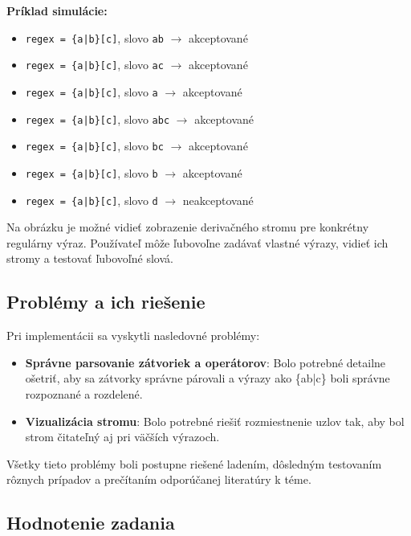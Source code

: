 \documentclass[a4paper,12pt]{article}
\begin{document}
\textbf{Príklad simulácie:}

\begin{itemize}
    \item \texttt{regex = \{a|b\}[c]}, slovo \texttt{ab} $\rightarrow$ akceptované
    \item \texttt{regex = \{a|b\}[c]}, slovo \texttt{ac} $\rightarrow$ akceptované
    \item \texttt{regex = \{a|b\}[c]}, slovo \texttt{a} $\rightarrow$ akceptované
    \item \texttt{regex = \{a|b\}[c]}, slovo \texttt{abc} $\rightarrow$ akceptované
    \item \texttt{regex = \{a|b\}[c]}, slovo \texttt{bc} $\rightarrow$ akceptované
    \item \texttt{regex = \{a|b\}[c]}, slovo \texttt{b} $\rightarrow$ akceptované
    \item \texttt{regex = \{a|b\}[c]}, slovo \texttt{d} $\rightarrow$ neakceptované
\end{itemize}

Na obrázku je možné vidieť zobrazenie derivačného stromu pre konkrétny regulárny výraz. Používateľ môže ľubovoľne zadávať vlastné výrazy, vidieť ich stromy a testovať ľubovoľné slová.

\subsection{Problémy a ich riešenie}

Pri implementácii sa vyskytli nasledovné problémy:
\begin{itemize}
    \item \textbf{Správne parsovanie zátvoriek a operátorov}: Bolo potrebné detailne ošetriť, aby sa zátvorky správne párovali a výrazy ako \{ab|c\} boli správne rozpoznané a rozdelené.
    \item \textbf{Vizualizácia stromu}: Bolo potrebné riešiť rozmiestnenie uzlov tak, aby bol strom čitateľný aj pri väčších výrazoch.
  
  
\end{itemize}

Všetky tieto problémy boli postupne riešené ladením, dôsledným testovaním rôznych prípadov a prečítaním odporúčanej literatúry k téme.

\subsection{Hodnotenie zadania}
\end{document}
